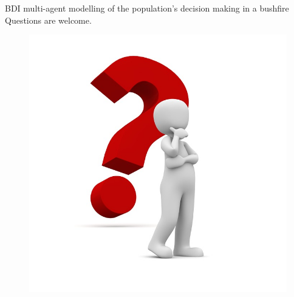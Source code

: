\documentclass{beamer}
\begin{document}
		\begin{frame}{BDI multi-agent modelling of the population's decision making in a bushfire}
			\centering
			Questions are welcome.
			\begin{figure}[h]
        \includegraphics[scale=0.2]{question.jpg}
      \end{figure}
		\end{frame}

  \footnotesize
  
  
\end{document}

